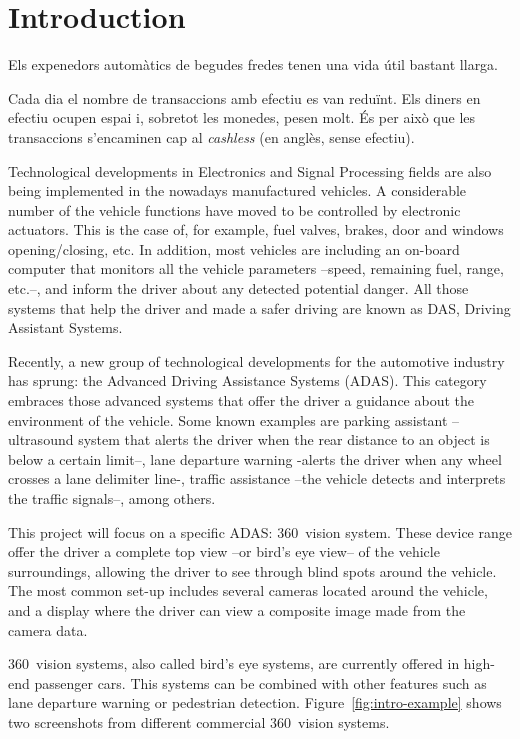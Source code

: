 \chapter{Introduction}

Els expenedors automàtics de begudes fredes tenen una vida útil bastant llarga. 

Cada dia el nombre de transaccions amb efectiu es van reduïnt. Els diners en efectiu ocupen espai i, sobretot les monedes, pesen molt. És per això que les transaccions s'encaminen cap al \textit{cashless} (en anglès, sense efectiu).



Technological developments in Electronics and Signal Processing fields are also being implemented in the nowadays manufactured vehicles. A considerable number of the vehicle functions have moved to be controlled by electronic actuators. This is the case of, for example, fuel valves, brakes, door and windows opening/closing, etc. In addition, most vehicles are including an on-board computer that monitors all the vehicle parameters --speed, remaining fuel, range, etc.--, and inform the driver about any detected potential danger. All those systems that help the driver and made a safer driving are known as DAS, Driving Assistant Systems.

Recently, a new group of technological   developments for the automotive industry has sprung: the Advanced Driving Assistance Systems (ADAS). This category embraces those advanced systems that offer the driver a guidance about the environment of the vehicle. Some known examples are parking assistant --ultrasound system that alerts the driver when the rear distance to an object is below a certain limit--, lane departure warning -alerts the driver when any wheel crosses a lane delimiter line-, traffic assistance --the vehicle detects and interprets the traffic signals--, among others.

This project will focus on a specific ADAS: 360\degree~vision system. These device range offer the driver a complete top view --or bird's eye view-- of the vehicle surroundings, allowing the driver to see through blind spots around the vehicle. The most common set-up  includes several cameras located around the vehicle, and a display where the driver can view a composite image made from the camera data.  

360\degree~vision systems, also called bird's eye systems, are currently offered in high-end passenger cars. This systems can be combined with other features such as lane departure warning or pedestrian detection. Figure~\ref{fig:intro-example} shows two screenshots from different commercial 360\degree~vision systems. 

